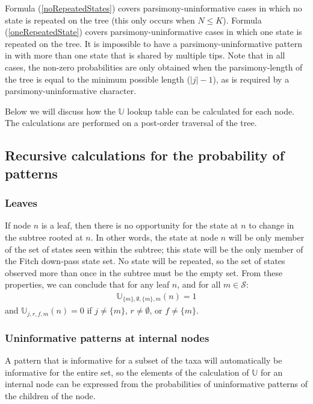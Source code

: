 \documentclass[11pt]{article}
\newcommand{\numStates}{\ensuremath{K}\xspace}
\newcommand{\numLeavesTotal}{\ensuremath{N}\xspace}
\newcommand{\allStates}{\ensuremath{\mathcal S}\xspace}
\newcommand{\probUninformPatClassSym}{\ensuremath{\mathbb U}\xspace}
\newcommand{\probUninformPatClass}[5]{\ensuremath{\probUninformPatClassSym_{#1,#2,#3,#4}\left(#5\right)}\xspace}
\begin{document}
Formula (\ref{noRepeatedStates}) covers parsimony-uninformative cases in which no state is repeated on the tree (this only occurs when $\numLeavesTotal\leq\numStates$).
Formula (\ref{oneRepeatedState}) covers parsimony-uninformative cases in which one state is repeated on the tree.
It is impossible to have a parsimony-uninformative pattern in with more than one state that is shared by multiple tips.
Note that in all cases, the non-zero probabilities are only obtained when the parsimony-length of the tree is equal to the minimum possible length ($|j| - 1$), as is required by a parsimony-uninformative character.

Below we will discuss how the $\probUninformPatClassSym$ lookup table can be calculated for each node.
The calculations are performed on a post-order traversal of the tree.

\subsection{Recursive calculations for the probability of patterns}
\subsubsection{Leaves}
If node $n$ is a leaf, then there is no opportunity for the state at $n$ to change in the subtree rooted at $n$.
In other words, the state at node $n$ will be only member of the set of states seen within the subtree; this state will be the only member of the Fitch down-pass state set.
No state will be repeated, so the set of states observed more than once in the subtree must be the empty set.
From these properties, we can conclude that for any leaf $n$, and for all $m \in \allStates$:
\begin{eqnarray}
	\probUninformPatClass{\{m\}}{\emptyset}{\{m\}}{m}{n} = 1 
\end{eqnarray}
and $\probUninformPatClass{j}{r}{f}{m}{n} = 0$ if $j\neq\{m\}$, $r\neq\emptyset$, or $f\neq\{m\}$.


\subsubsection{Uninformative patterns at internal nodes}
A pattern that is informative for a subset of the taxa will automatically be informative for the entire set, so the elements of the calculation of $\probUninformPatClassSym$ for an internal node can be expressed from the probabilities of uninformative patterns of the children of the node.
\end{document}
